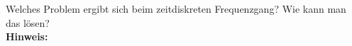\begin{question}[section=6,name={Zeitdiskreten Frequenzgang},difficulty=,type=mdl,tags={}]
	Welches Problem ergibt sich beim zeitdiskreten Frequenzgang? Wie kann man das lösen?
	\\ \textbf{Hinweis:}\\
	
\end{question}
\begin{solution}
	
\end{solution}